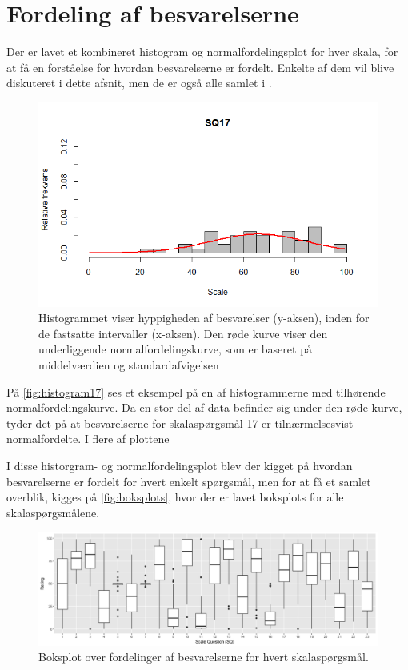 \section{Fordeling af besvarelserne}
\label{TestAfSkalaFordeling}
%
Der er lavet et kombineret histogram og normalfordelingsplot for hver skala, for at få en forståelse for hvordan besvarelserne er fordelt. Enkelte af dem vil blive diskuteret i dette afsnit, men de er også alle samlet i .

\begin{figure}[H]
\centering
\includegraphics[width = \textwidth]{Figure/DatabehandlingSkalaer/HistogramNormalFordeling/SQ17} 
\caption{Histogrammet viser hyppigheden af besvarelser (y-aksen), inden for de fastsatte intervaller (x-aksen). Den røde kurve viser den underliggende normalfordelingskurve, som er baseret på middelværdien og standardafvigelsen}
\label{fig:histogram17}
\end{figure}
\noindent
%
På \autoref{fig:histogram17} ses et eksempel på en af histogrammerne med tilhørende normalfordelingskurve. Da en stor del af data befinder sig under den røde kurve, tyder det på at besvarelserne for skalaspørgsmål 17 er tilnærmelsesvist normalfordelte.\blankline
%
I flere af plottene 

\blankline
%
I disse historgram- og normalfordelingsplot blev der kigget på hvordan besvarelserne er fordelt for hvert enkelt spørgsmål, men for at få et samlet overblik, kigges på \autoref{fig:boksplots}, hvor der er lavet boksplots for alle skalaspørgsmålene.

\begin{figure}[H]
\centering
\includegraphics[width = \textwidth]{Figure/DatabehandlingSkalaer/boksplot0er} 
\caption{Boksplot over fordelinger af besvarelserne for hvert skalaspørgsmål.}
\label{fig:boksplots}
\end{figure}
\noindent
%

